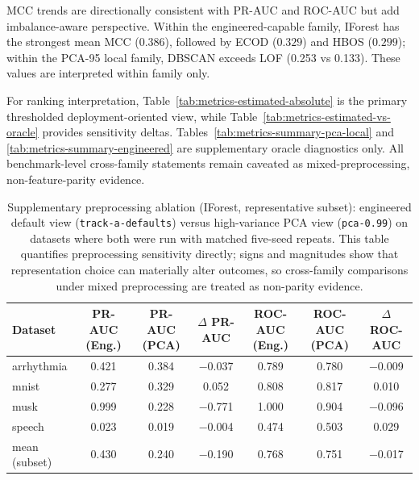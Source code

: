 \documentclass[cameraready]{Interspeech}
\begin{document}
\noindent MCC trends are directionally consistent with PR-AUC and ROC-AUC but add imbalance-aware perspective. Within the engineered-capable family, IForest has the strongest mean MCC (\(0.386\)), followed by ECOD (\(0.329\)) and HBOS (\(0.299\)); within the PCA-95 local family, DBSCAN exceeds LOF (0.253 vs 0.133). These values are interpreted within family only.

For ranking interpretation, Table~\ref{tab:metrics-estimated-absolute} is the primary thresholded deployment-oriented view, while Table~\ref{tab:metrics-estimated-vs-oracle} provides sensitivity deltas. Tables~\ref{tab:metrics-summary-pca-local} and \ref{tab:metrics-summary-engineered} are supplementary oracle diagnostics only. All benchmark-level cross-family statements remain caveated as mixed-preprocessing, non-feature-parity evidence.

\begin{table}[!ht]
\centering
\caption{Supplementary preprocessing ablation (IForest, representative subset): engineered default view (\texttt{track-a-defaults}) versus high-variance PCA view (\texttt{pca-0.99}) on datasets where both were run with matched five-seed repeats. This table quantifies preprocessing sensitivity directly; signs and magnitudes show that representation choice can materially alter outcomes, so cross-family comparisons under mixed preprocessing are treated as non-parity evidence.}
\label{tab:iforest-preprocess-ablation}
\small
\setlength{\tabcolsep}{6pt}
\begin{tabular}{l
                S[table-format=1.3]
                S[table-format=1.3]
                S[table-format=1.3]
                S[table-format=1.3]
                S[table-format=1.3]
                S[table-format=1.3]}
\toprule
\textbf{Dataset} & {\textbf{PR-AUC (Eng.)}} & {\textbf{PR-AUC (PCA)}} & {\(\Delta\) \textbf{PR-AUC}} & {\textbf{ROC-AUC (Eng.)}} & {\textbf{ROC-AUC (PCA)}} & {\(\Delta\) \textbf{ROC-AUC}} \\
\midrule
arrhythmia & \num{0.421} & \num{0.384} & \num{-0.037} & \num{0.789} & \num{0.780} & \num{-0.009} \\
mnist      & \num{0.277} & \num{0.329} & \num{0.052}  & \num{0.808} & \num{0.817} & \num{0.010} \\
musk       & \num{0.999} & \num{0.228} & \num{-0.771} & \num{1.000} & \num{0.904} & \num{-0.096} \\
speech     & \num{0.023} & \num{0.019} & \num{-0.004} & \num{0.474} & \num{0.503} & \num{0.029} \\
\midrule
mean (subset) & \num{0.430} & \num{0.240} & \num{-0.190} & \num{0.768} & \num{0.751} & \num{-0.017} \\
\bottomrule
\end{tabular}
\end{table}
\end{document}
